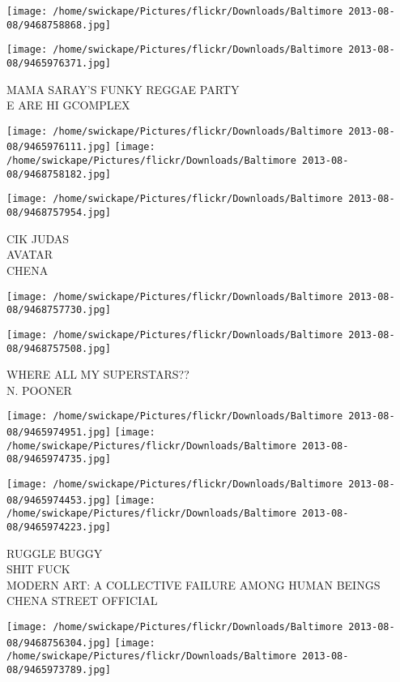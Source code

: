 \documentclass[10pt,letterpaper]{article}
\begin{document}
\texttt{[image: /home/swickape/Pictures/flickr/Downloads/Baltimore 2013-08-08/9468758868.jpg]}

\vspace{0.25in}
\texttt{[image: /home/swickape/Pictures/flickr/Downloads/Baltimore 2013-08-08/9465976371.jpg]}

MAMA SARAY'S FUNKY REGGAE PARTY\\
E ARE HI GCOMPLEX
\pagebreak

\texttt{[image: /home/swickape/Pictures/flickr/Downloads/Baltimore 2013-08-08/9465976111.jpg]}
\texttt{[image: /home/swickape/Pictures/flickr/Downloads/Baltimore 2013-08-08/9468758182.jpg]}

\vspace{0.25in}
\texttt{[image: /home/swickape/Pictures/flickr/Downloads/Baltimore 2013-08-08/9468757954.jpg]}

CIK JUDAS\\
AVATAR\\
CHENA
\pagebreak

\texttt{[image: /home/swickape/Pictures/flickr/Downloads/Baltimore 2013-08-08/9468757730.jpg]}

\vspace{0.25in}
\texttt{[image: /home/swickape/Pictures/flickr/Downloads/Baltimore 2013-08-08/9468757508.jpg]}

WHERE ALL MY SUPERSTARS??\\
N. POONER
\pagebreak

\texttt{[image: /home/swickape/Pictures/flickr/Downloads/Baltimore 2013-08-08/9465974951.jpg]}
\texttt{[image: /home/swickape/Pictures/flickr/Downloads/Baltimore 2013-08-08/9465974735.jpg]}

\texttt{[image: /home/swickape/Pictures/flickr/Downloads/Baltimore 2013-08-08/9465974453.jpg]}
\texttt{[image: /home/swickape/Pictures/flickr/Downloads/Baltimore 2013-08-08/9465974223.jpg]}

RUGGLE BUGGY\\
SHIT FUCK\\
MODERN ART: A COLLECTIVE FAILURE AMONG HUMAN BEINGS\\
CHENA STREET OFFICIAL
\pagebreak

\texttt{[image: /home/swickape/Pictures/flickr/Downloads/Baltimore 2013-08-08/9468756304.jpg]}
\texttt{[image: /home/swickape/Pictures/flickr/Downloads/Baltimore 2013-08-08/9465973789.jpg]}
\end{document}

